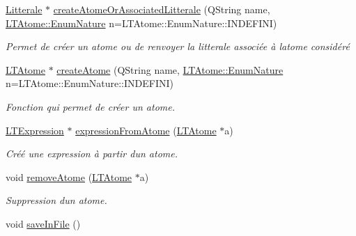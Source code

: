 \begin{DoxyCompactItemize}
\item 
\hyperlink{class_litterale}{Litterale} $\ast$ \hyperlink{class_l_t_atome_manager_a56939fbd4c4200c169d5cc5033d5cb31}{create\+Atome\+Or\+Associated\+Litterale} (Q\+String name, \hyperlink{class_l_t_atome_a340480fc682a6d8fd819026d20278b49}{L\+T\+Atome\+::\+Enum\+Nature} n=L\+T\+Atome\+::\+Enum\+Nature\+::\+I\+N\+D\+E\+F\+I\+NI)
\begin{DoxyCompactList}\small\item\em Permet de créer un atome ou de renvoyer la litterale associée à l\textquotesingle{}atome considéré \end{DoxyCompactList}\item 
\hyperlink{class_l_t_atome}{L\+T\+Atome} $\ast$ \hyperlink{class_l_t_atome_manager_a54aa2976d7890586510eb5c5ba0e286e}{create\+Atome} (Q\+String name, \hyperlink{class_l_t_atome_a340480fc682a6d8fd819026d20278b49}{L\+T\+Atome\+::\+Enum\+Nature} n=L\+T\+Atome\+::\+Enum\+Nature\+::\+I\+N\+D\+E\+F\+I\+NI)
\begin{DoxyCompactList}\small\item\em Fonction qui permet de créer un atome. \end{DoxyCompactList}\item 
\hyperlink{class_l_t_expression}{L\+T\+Expression} $\ast$ \hyperlink{class_l_t_atome_manager_a94b3cee113aa00c935478ae35a4d48ef}{expression\+From\+Atome} (\hyperlink{class_l_t_atome}{L\+T\+Atome} $\ast$a)
\begin{DoxyCompactList}\small\item\em Créé une expression à partir d\textquotesingle{}un atome. \end{DoxyCompactList}\item 
void \hyperlink{class_l_t_atome_manager_a8331ed1c68938aa1b7f53460811b8149}{remove\+Atome} (\hyperlink{class_l_t_atome}{L\+T\+Atome} $\ast$a)
\begin{DoxyCompactList}\small\item\em Suppression d\textquotesingle{}un atome. \end{DoxyCompactList}\item 
void \hyperlink{class_l_t_atome_manager_a1177ea9fc37d29a4f97a9d80ba057060}{save\+In\+File} ()\hypertarget{class_l_t_atome_manager_a1177ea9fc37d29a4f97a9d80ba057060}{}\label{class_l_t_atome_manager_a1177ea9fc37d29a4f97a9d80ba057060}


\end{DoxyCompactItemize}

